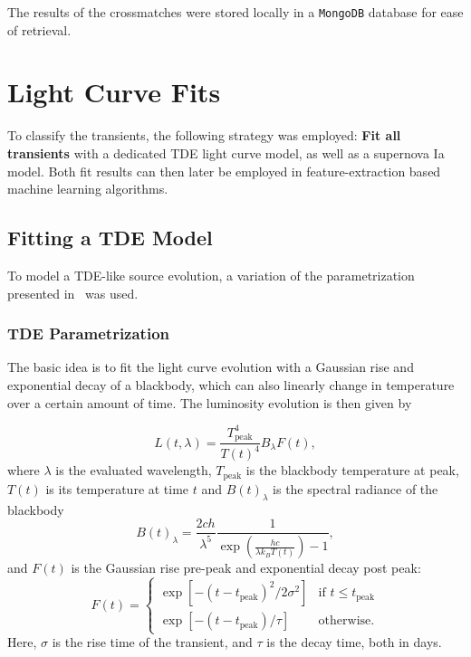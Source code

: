 The results of the crossmatches were stored locally in a \texttt{MongoDB} database for ease of retrieval.

\section{Light Curve Fits}
To classify the transients, the following strategy was employed: \textbf{Fit all transients} with a dedicated TDE light curve model, as well as a supernova Ia model. Both fit results can then later be employed in feature-extraction based machine learning algorithms.

\subsection{Fitting a TDE Model}\label{tde_model}
To model a TDE-like source evolution, a variation of the parametrization presented in~\cite{Velzen2021a} was used.

\subsubsection{TDE Parametrization}
The basic  idea is to fit the light curve evolution with a Gaussian rise and exponential decay of a blackbody, which can also linearly change in temperature over a certain amount of time. The luminosity evolution is then given by

\begin{equation}
    L(t,\lambda) = \frac{T_\text{peak}^4}{T(t)^4} B_\lambda F(t),
\end{equation}
where $\lambda$ is the evaluated wavelength, $T_\text{peak}$ is the blackbody temperature at peak, $T(t)$ is its temperature at time $t$ and $B(t)_\lambda$ is the spectral radiance of the blackbody
\begin{equation}
    B(t)_\lambda = \frac{2 c h}{\lambda^5} \frac{1}{\exp(\frac{hc}{\lambda k_B T(t)})-1},
\end{equation}
and $F(t)$ is the Gaussian rise pre-peak and exponential decay post peak:
\begin{equation}
    F(t) = \begin{cases}
        \exp[-(t-t_\text{peak})^2/2\sigma^2] & \text{if } t\leq t_\text{peak} \\
        \exp[-(t-t_\text{peak})/\tau]        & \text{otherwise.}
    \end{cases}
\end{equation}
Here, $\sigma$ is the rise time of the transient, and $\tau$ is the decay time, both in days.

